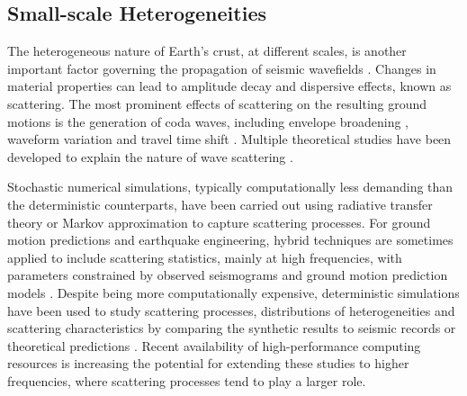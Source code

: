 \subsection{Small-scale Heterogeneities}

The heterogeneous nature of Earth's crust, at different scales, is another important factor governing the propagation of seismic wavefields \citep{levanderSmallscaleHeterogeneityLargescale1992,levanderCrustHeterogeneousOptical1994,beanStatisticalMeasuresCrustal1999,helffrichEarthMantle2001,hedlinSeismicEvidenceSmallscale1997}. Changes in material properties can lead to amplitude decay and dispersive effects, known as scattering. The most prominent effects of scattering on the resulting ground motions is the generation of coda waves, including envelope broadening \citep{satoBroadeningSeismogramEnvelopes1989}, waveform variation and travel time shift \citep{flatteSmallscaleStructureLithosphere1988}. Multiple theoretical studies have been developed to explain the nature of wave scattering \citep{akiAnalysisSeismicCoda1969, wuMultipleScatteringEnergy1985,akiOriginCodaWaves1975,zengScatteringWaveEnergy1991,zengTheoryScatteredSwave1993,zengSubeventRakeRandom1995}.

Stochastic numerical simulations, typically computationally less demanding than the deterministic counterparts, have been carried out using radiative transfer theory \citep{gusevSimulatedEnvelopesNonisotropically1996,przybillaRadiativeTransferElastic2006} or Markov approximation \citep{saitoEnvelopeBroadeningSpherically2002,sawazakiEnvelopeSynthesisShortperiod2011} to capture scattering processes. For ground motion predictions and earthquake engineering, hybrid techniques are sometimes applied to include scattering statistics, mainly at high frequencies, with parameters constrained by observed seismograms and ground motion prediction models \citep{liuPredictionBroadbandGroundMotion2006,gravesBroadbandGroundMotionSimulation2010, maiHybridBroadbandGroundMotion2010}.
Despite being more computationally expensive, deterministic simulations have been used to study scattering processes, distributions of heterogeneities and scattering characteristics by comparing the synthetic results to seismic records or theoretical predictions \citep{frankelFiniteDifferenceSimulations1986,rothSingleScatteringTheory1993,shapiroSeismicAttenuationScattering1993,thyboSeismicScatteringTop2003}. Recent availability of high-performance computing resources is increasing the potential for extending these studies to higher frequencies, where scattering processes tend to play a larger role.

